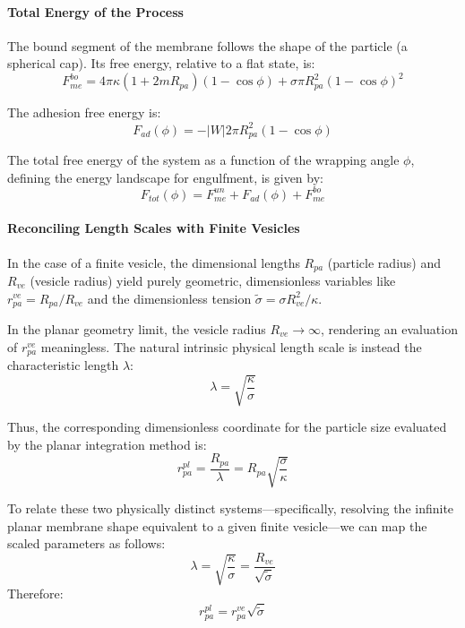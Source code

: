 \documentclass[11pt]{article}
\begin{document}
\paragraph{Total Energy of the Process}
The bound segment of the membrane follows the shape of the particle (a spherical cap). Its free energy, relative to a flat state, is:
\begin{equation}
    F_{me}^{bo} = 4 \pi \kappa (1 + 2mR_{pa})(1 - \cos \phi)  + \sigma \pi R_{pa}^2(1-\cos \phi)^2
\end{equation}

The adhesion free energy is:
\begin{equation}
    F_{ad}(\phi) = - |W| 2 \pi R_{pa}^2 (1 - \cos \phi)
\end{equation}

The total free energy of the system as a function of the wrapping angle $\phi$, defining the energy landscape for engulfment, is given by:
\begin{equation}
    F_{tot}(\phi) = F_{me}^{un} + F_{ad}(\phi) + F_{me}^{bo}
\end{equation}

\paragraph{Reconciling Length Scales with Finite Vesicles}
In the case of a finite vesicle, the dimensional lengths $R_{pa}$ (particle radius) and $R_{ve}$ (vesicle radius) yield purely geometric, dimensionless variables like $r_{pa}^{ve} = R_{pa} / R_{ve}$ and the dimensionless tension $\tilde{\sigma} = \sigma R_{ve}^2 / \kappa$.

In the planar geometry limit, the vesicle radius $R_{ve} \to \infty$, rendering an evaluation of $r_{pa}^{ve}$ meaningless. The natural intrinsic physical length scale is instead the characteristic length $\lambda$:
\begin{equation}
\lambda = \sqrt{\frac{\kappa}{\sigma}}
\end{equation}

Thus, the corresponding dimensionless coordinate for the particle size evaluated by the planar integration method is:
\begin{equation}
r_{pa}^{pl} = \frac{R_{pa}}{\lambda} = R_{pa} \sqrt{\frac{\sigma}{\kappa}}
\end{equation}

To relate these two physically distinct systems—specifically, resolving the infinite planar membrane shape equivalent to a given finite vesicle—we can map the scaled parameters as follows:
\begin{equation}
\lambda = \sqrt{\frac{\kappa}{\sigma}} = \frac{R_{ve}}{\sqrt{\tilde{\sigma}}}
\end{equation}
Therefore:
\begin{equation}
r_{pa}^{pl} = r_{pa}^{ve} \sqrt{\tilde{\sigma}}
\end{equation}
\end{document}
